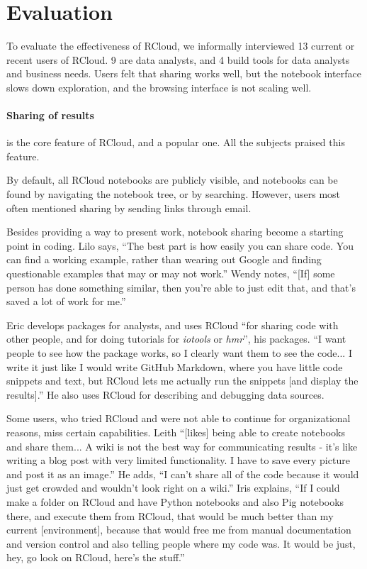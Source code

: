 \section{Evaluation\label{sec:interviews}}

To evaluate the effectiveness of RCloud, we informally interviewed 13 current or
recent users of RCloud. 9 are data analysts, and 4 build tools for data
analysts and business needs. Users felt that sharing works well, but the notebook
interface slows down exploration, and the browsing interface is not scaling well.

\paragraph*{Sharing of results} is the core feature of RCloud, and a popular one. All
the subjects praised this feature.

By default, all RCloud notebooks are publicly visible, and notebooks can be
found by navigating the notebook tree, or by searching. However, users most
often mentioned sharing by sending links through email.

Besides providing a way to present work, notebook sharing become a starting point
in coding. Lilo says, ``The best part is how easily you can
share code. You can find a working example, rather than wearing
out Google and finding questionable examples that may or may not work.'' Wendy
notes, ``[If] some person has done something similar, then you're able to just
edit that, and that's saved a lot of work for me.''

Eric develops packages for analysts, and uses RCloud ``for sharing code with
other people, and for doing tutorials for {\em iotools} or {\em hmr}'', his packages.
``I want people to see how the package works, so I clearly want them
to see the code... I write it just like I would write GitHub
Markdown, where you have little code snippets and text, but RCloud lets me
actually run the snippets [and display the results].'' He also uses RCloud for
describing and debugging data sources.

Some users, who tried RCloud and were not able to continue for organizational
reasons, miss certain capabilities. Leith ``[likes]  being
able to create notebooks and share them... A wiki is not the best way for
communicating results - it's  like writing a blog post with very limited
functionality. I have to save every picture and post it as an image.'' He adds,
``I can't share all of the code because it would just get crowded and wouldn't
look right on a wiki.'' Iris explains, ``If I could make a folder on RCloud and
have Python notebooks and also Pig notebooks there, and execute them from RCloud,
that would be much better than my current [environment], because that would free
me from manual documentation and version control and also telling people where
my code was. It would be just, hey, go look on RCloud, here's the stuff.''

